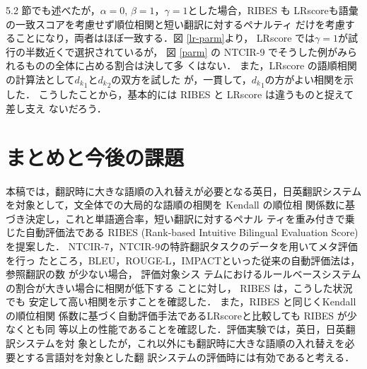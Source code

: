 \documentclass[japanese]{jnlp_1.4}
\begin{document}
5.2 節でも述べたが，$\alpha=0$, $\beta=1$，$\gamma=1$とした場合，RIBES も
LRscoreも語彙の一致スコアを考慮せず順位相関と短い翻訳に対するペナルティ
だけを考慮することになり，両者はほぼ一致する．図 \ref{lr-parm}より，
LRscore では$\gamma=1$が試行の半数近くで選択されているが，
図 \ref{parm}
の NTCIR-9 でそうした例がみられるものの全体に占める割合は決して多
くはない．
また，LRscore の語順相関の計算法として${d_k}_1$と${d_k}_2$の双方を試した
が，一貫して，${d_k}_1$の方がよい相関を示した．
こうしたことから，基本的には RIBES と LRscore は違うものと捉えて差し支え
ないだろう．


\section{まとめと今後の課題}

本稿では，翻訳時に大きな語順の入れ替えが必要となる英日，日英翻訳システム
を対象として，文全体での大局的な語順の相関を Kendall の順位相
関係数に基づき決定し，これと単語適合率，短い翻訳に対するペナル
ティを重み付きで乗じた自動評価法である RIBES (Rank-based Intuitive
Bilingual Evaluation Score) を提案した．
NTCIR-7，NTCIR-9の特許翻訳タスクのデータを用いてメタ評価を行っ
たところ，BLEU，ROUGE-L，IMPACTといった従来の自動評価法は，参照翻訳の数
が少ない場合，
評価対象シス
テムにおけるルールベースシステムの割合が大きい場合に相関が低下する
ことに対し，
RIBES は，こうした状況でも
安定して高い相関を示すことを確認した．
また，RIBES と同じくKendallの順位相関
係数に基づく自動評価手法であるLRscoreと比較しても RIBES が少なくとも同
等以上の性能であることを確認した．評価実験では，英日，日英翻訳システムを対
象としたが，これ以外にも翻訳時に大きな語順の入れ替えを必要とする言語対を対象とした翻
訳システムの評価時には有効であると考える．
\end{document}
